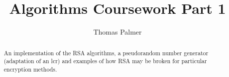 \documentclass[]{report}
\title{Algorithms Coursework Part 1}
\author{Thomas Palmer}
\begin{document}
\maketitle

\begin{abstract}
	An implementation of the RSA algorithms, a pseudorandom number generator (adaptation of an lcr) and examples of how RSA may be broken for particular encryption methods.
\end{abstract}
\end{document}
